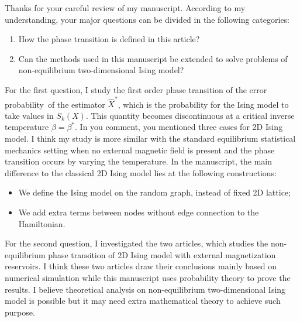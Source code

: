 \documentclass{article}
\begin{document}
	\pagestyle{empty}
	Thanks for your careful review of my manuscript. According to my understanding, your major
	questions can be divided in the following categories:
	\begin{enumerate}
		\item How the phase transition is defined in this article?
		\item Can the methods used in this manuscript be extended to solve problems of non-equilibrium two-dimensional Ising model?
	\end{enumerate}
	
	For the first question, I study the first order phase transition of the error probability of the estimator $\hat{X}^*$, which is the probability for the Ising model to take values in $S_k(X)$.
	This quantity becomes discontinuous at a critical inverse temperature $\beta=\beta^*$. In you
	comment, you mentioned three cases for 2D Ising model. I think my study is more similar with
	the standard equilibrium statistical mechanics setting when no external magnetic field is present
	and the phase transition occurs by varying the temperature. In the manuscript, the main difference to the classical 2D Ising model lies at the following constructions:
	\begin{itemize}
		\item We define the Ising model on the random graph, instead of fixed 2D lattice;
		\item We add extra terms between nodes without edge connection to the Hamiltonian.
	\end{itemize}
	
	For the second question, I investigated the two articles, which studies the non-equilibrium phase transition of 2D Ising model with external magnetization reservoirs. I think these two articles
	draw their conclusions mainly based on numerical simulation while this manuscript uses probability
	theory to prove the results. I believe theoretical analysis on non-equilibrium two-dimensional Ising model is possible but it may need extra mathematical theory to achieve such purpose.
\end{document}

